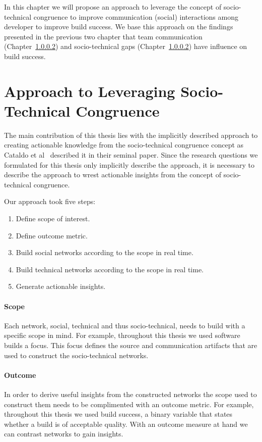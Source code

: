 \label{chap:approach}
In this chapter we will propose an approach to leverage the concept of socio-technical congruence to improve communication (social) interactions among developer to improve build success.
We base this approach on the findings presented in the previous two chapter that team communication (Chapter~\ref{}) and socio-technical gaps (Chapter~\ref{}) have influence on build success.

\section{Approach to Leveraging Socio-Technical Congruence}
The main contribution of this thesis lies with the implicitly described approach to creating actionable knowledge from the socio-technical congruence concept as Cataldo et al~\cite{cataldo:cscw:2006} described it in their seminal paper.
Since the research questions we formulated for this thesis only implicitly describe the approach, it is necessary to describe the approach to wrest actionable insights from the concept of socio-technical congruence.

Our approach took five steps:
\begin{enumerate}
\item Define scope of interest.
\item Define outcome metric.
\item Build social networks according to the scope in real time.
\item Build technical networks according to the scope in real time.
\item Generate actionable insights.
\end{enumerate}

\paragraph{Scope} 
Each network, social, technical and thus socio-technical, needs to build with a specific scope in mind.
For example, throughout this thesis we used software builds a focus.
This focus defines the source and communication artifacts that are used to construct the socio-technical networks. 

\paragraph{Outcome}
In order to derive useful insights from the constructed networks the scope used to construct them needs to be complimented with an outcome metric.
For example, throughout this thesis we used build success, a binary variable that states whether a build is of acceptable quality.
With an outcome measure at hand we can contrast networks to gain insights.

